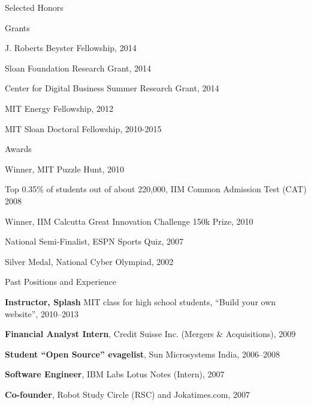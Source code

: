 \documentclass{resume} %
\begin{document}
\begin{rSection}{Selected Honors}

\begin{rSubsection}{Grants}{}{}{}
\item J. Roberts Beyster Fellowship, 2014
\item Sloan Foundation Research Grant, 2014
\item Center for Digital Business Summer Research Grant, 2014
\item MIT Energy Fellowship, 2012
\item MIT Sloan Doctoral Fellowship, 2010-2015
\end{rSubsection}

\begin{rSubsection}{Awards}{}{}{}
\item Winner, MIT Puzzle Hunt, 2010
\item Top 0.35\% of students out of about 220,000, IIM Common Admission Test (CAT) 2008
\item Winner, IIM Calcutta Great Innovation Challenge 150k Prize, 2010
\item National Semi-Finalist, ESPN Sports Quiz, 2007
\item Silver Medal, National Cyber Olympiad, 2002
\end{rSubsection}

\end{rSection}


\begin{rSection}{Past Positions and Experience}

\begin{rSubsection}{}{}{}{}

\item \textbf{Instructor, Splash} MIT class for high school students, ``Build your own website'', 2010--2013
\item \textbf{Financial Analyst Intern}, Credit Suisse Inc. (Mergers \& Acquisitions), 2009
\item \textbf{Student ``Open Source'' evagelist}, Sun Microsystems India, 2006--2008
\item \textbf{Software Engineer}, IBM Labs Lotus Notes (Intern), 2007
\item \textbf{Co-founder}, Robot Study Circle (RSC) and Jokatimes.com, 2007

\end{rSubsection}

\end{rSection}
\end{document}
